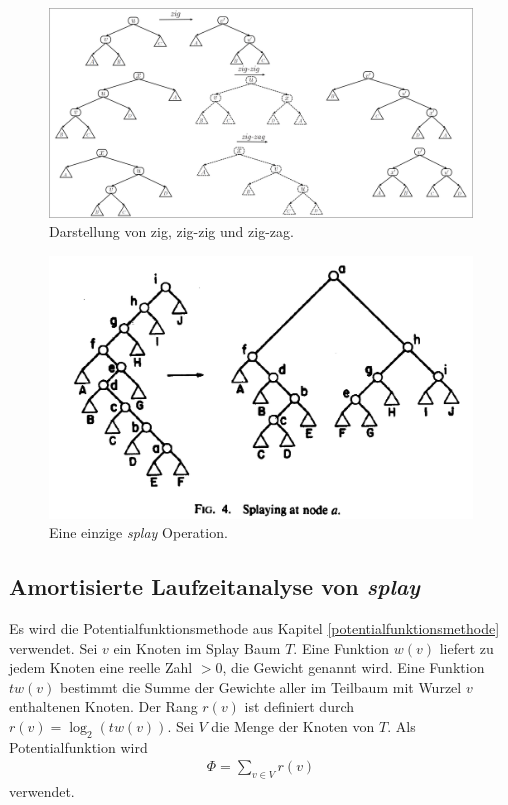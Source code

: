 \documentclass[a4paper,12pt]{article}
\begin{document}
\begin{figure}[H]
	\centering
	\includegraphics[width= 1.2\textwidth]{"Medien/Splaybaum/zigZag"}
	\caption{Darstellung von zig, zig-zig und zig-zag. }
	\label{fig:zigZag}
\end{figure}
\begin{figure}[H]
	\centering
	\includegraphics[width= 1\textwidth]{"Medien/Splaybaum/splay"}
	\caption{Eine einzige \textit{splay } Operation.\cite{splay}}
	\label{fig:splay}
\end{figure}

\subsection{Amortisierte Laufzeitanalyse von \textit{splay }}
Es wird die Potentialfunktionsmethode aus Kapitel \ref{potentialfunktionsmethode} verwendet. Sei $v$ ein Knoten im Splay Baum $T$. Eine Funktion $w\left(v\right)$ liefert zu jedem Knoten eine reelle Zahl $>0$, die Gewicht genannt wird. Eine Funktion $\mathit{tw}\left(v\right)$ bestimmt die Summe der Gewichte aller im Teilbaum mit Wurzel $v$ enthaltenen Knoten. Der Rang  $r\left(v\right)$ ist definiert durch $r\left(v\right) = \log_2 \left( \mathit{tw}\left(v\right)\right)$. Sei $V$ die Menge der Knoten von $T$. Als Potentialfunktion wird 
\begin{align*}
\Phi = \sum_{v \in V} r\left(v\right)
\end{align*}
verwendet.
\end{document}
